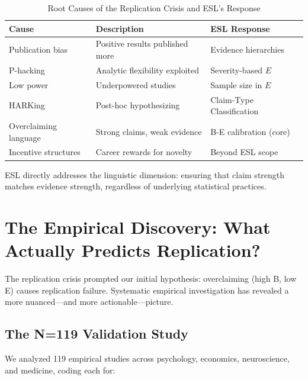 \documentclass[11pt,a4paper]{article}
\begin{document}
\begin{table}[h]
\centering
\caption{Root Causes of the Replication Crisis and ESL's Response}
\label{tab:root-causes}
\begin{tabular}{p{4cm}p{5cm}p{4cm}}
\toprule
\textbf{Cause} & \textbf{Description} & \textbf{ESL Response} \\
\midrule
Publication bias & Positive results published more & Evidence hierarchies \\
P-hacking & Analytic flexibility exploited & Severity-based $E$ \\
Low power & Underpowered studies & Sample size in $E$ \\
HARKing & Post-hoc hypothesizing & Claim-Type Classification \\
Overclaiming language & Strong claims, weak evidence & B-E calibration (core) \\
Incentive structures & Career rewards for novelty & Beyond ESL scope \\
\bottomrule
\end{tabular}
\end{table}

ESL directly addresses the linguistic dimension: ensuring that claim strength matches evidence strength, regardless of underlying statistical practices.


\section{The Empirical Discovery: What Actually Predicts Replication?}
\label{sec:empirical-discovery}

The replication crisis prompted our initial hypothesis: overclaiming (high B, low E) causes replication failure. Systematic empirical investigation has revealed a more nuanced---and more actionable---picture.

\subsection{The N=119 Validation Study}

We analyzed 119 empirical studies across psychology, economics, neuroscience, and medicine, coding each for:
\end{document}
